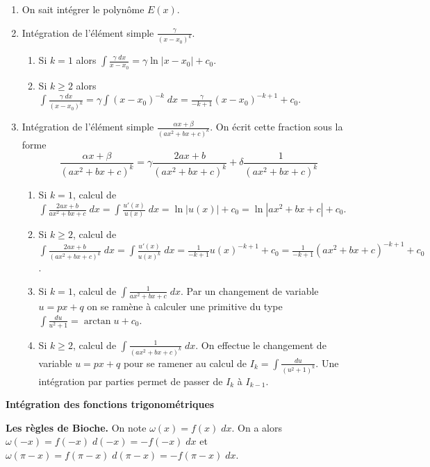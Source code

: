 \documentclass[10pt,class=article,crop=false]{standalone}
\begin{document}
\begin{multicols}{2}
\begin{enumerate}
	\item On sait intégrer le polynôme $E(x)$.
	
	\item Intégration de l'élément simple $\frac{\gamma}{(x - x_0)^k}$.
	\begin{enumerate}
		\item Si $k=1$ alors $\int \frac{\gamma \; dx}{x - x_0} = \gamma \ln|x - x_0|+c_0$.
		\item Si $k\ge 2$ alors  $\int \frac{\gamma \; dx}{(x - x_0)^k} = \gamma \int (x - x_0)^{-k} \; dx
		= \frac{\gamma}{-k+1}(x - x_0)^{-k+1}+c_0$.
	\end{enumerate}
	
	\item Intégration de l'élément simple $\frac{\alpha x+\beta}{(a x^2+b x+c)^k}$.
	On écrit cette fraction sous la forme
	$$\frac{\alpha x+\beta}{(a x^2+b x+c)^k} = \gamma \frac{2a x+b}{(a x^2+b x+c)^k} + \delta \frac{1}{(a x^2+b x+c)^k}$$
	\begin{enumerate}
		\item Si $k=1$, calcul de $\int \frac{2a x+b}{a x^2+b x+c} \; dx = \int \frac{u'(x)}{u(x)} \; dx = \ln |u(x)| + c_0
		= \ln |a x^2+b x+c|+c_0$.
		
		\item Si $k\ge 2$, calcul de $\int \frac{2a x+b}{(a x^2+b x+c)^k} \; dx = \int \frac{u'(x)}{u(x)^k} \; dx = \frac{1}{-k+1}u(x)^{-k+1}+c_0
		= \frac{1}{-k+1}(a x^2+b x+c)^{-k+1}+c_0$.
		
		\item Si $k=1$, calcul de $\int \frac{1}{a x^2+b x+c}\; dx$. Par un changement de variable $u= px+q$ on se ramène à
		calculer une primitive du type
		$\int \frac{du}{u^2+1}=\arctan u + c_0$.
		
		\item Si $k\ge 2$, calcul de $\int \frac{1}{(a x^2+b x+c)^k} \; dx$. On effectue le changement de variable $u=px+q$
		pour se ramener au calcul de $I_k =\int \frac{du}{(u^2+1)^k}$.
		Une intégration par parties permet de passer de $I_k$ à $I_{k-1}$.
	
	\end{enumerate}
\end{enumerate}


\textbf{Intégration des fonctions trigonométriques}


\textbf{Les règles de Bioche.}
On note $\omega(x) = f(x)\;dx$.
On a alors $\omega(-x)= f(-x)\;d(-x)=-f(-x)\;dx$ et
$\omega (\pi-x)= f(\pi-x)\;d(\pi-x)=-f(\pi-x)\;dx$.




\end{multicols}
\end{document}
